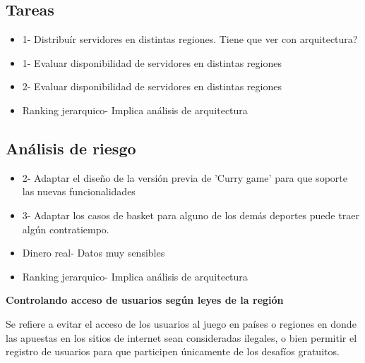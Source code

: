 \subsection{Tareas}

\begin{itemize}
  \item 1- Distribuír servidores en distintas regiones. Tiene que ver con arquitectura?
  \item 1- Evaluar disponibilidad de servidores en distintas regiones
  \item 2- Evaluar disponibilidad de servidores en distintas regiones
  \item Ranking jerarquico- Implica análisis de arquitectura
\end{itemize}

\subsection{Análisis de riesgo}

\begin{itemize}
  \item 2- Adaptar el diseño de la versión previa de 'Curry game' para que soporte las nuevas funcionalidades
  \item 3- Adaptar los casos de basket para alguno de los demás deportes puede traer algún contratiempo.
  \item Dinero real- Datos muy sensibles
  \item Ranking jerarquico- Implica análisis de arquitectura
\end{itemize}

\textbf{Controlando acceso de usuarios según leyes de la región}

Se refiere a evitar el acceso de los usuarios al juego en países o regiones en donde las apuestas en los sitios de internet sean consideradas
ilegales, o bien permitir el registro de usuarios para que participen únicamente de los desafíos gratuitos.

~

